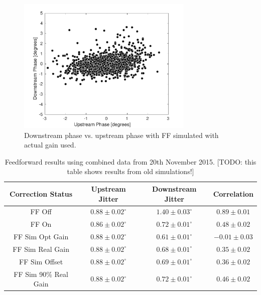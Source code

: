 \begin{figure}
  \centering
  \includegraphics[width=0.75\textwidth]{Figures/feedforward/longFF_scatterFFSimReal}
  \caption{Downstream phase vs. upstream phase with FF simulated with actual gain used.}
  \label{f:longFF_scatterFFSimReal}
\end{figure}

\begin{table}
  \begin{center}
    \begin{tabular}{| c | c | c | c |}
	   \hline
       Correction Status & Upstream Jitter & Downstream Jitter & Correlation \\ \hline
       FF Off & \(0.88\pm0.02^\circ\) & \(1.40\pm0.03^\circ\) & \(0.89\pm0.01\) \\
	   FF On & \(0.86\pm0.02^\circ\) & \(0.72\pm0.01^\circ\) & \(0.48\pm0.02\) \\
	   FF Sim Opt Gain & \(0.88\pm0.02^\circ\) & \(0.61\pm0.01^\circ\) & \(-0.01\pm0.03\) \\
	   FF Sim Real Gain & \(0.88\pm0.02^\circ\) & \(0.68\pm0.01^\circ\) & \(0.35\pm0.02\) \\
	   FF Sim Offset & \(0.88\pm0.02^\circ\) & \(0.69\pm0.01^\circ\) & \(0.36\pm0.02\) \\
	   FF Sim 90\% Real Gain & \(0.88\pm0.02^\circ\) & \(0.72\pm0.01^\circ\) & \(0.46\pm0.02\) \\ \hline
    \end{tabular}
    \caption{Feedforward results using combined data from 20th November 2015. [TODO: this table shows results from old simulations!]}
  	\label{t:LongFF}
  \end{center}
\end{table}



